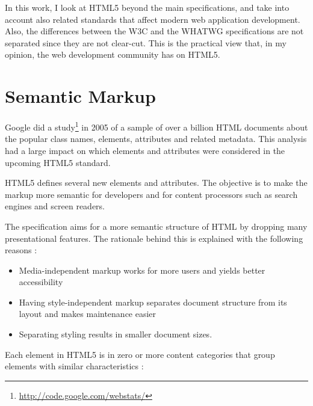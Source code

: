 In this work, I look at HTML5 beyond the main specifications, and take
into account also related standards that affect modern web application
development. Also, the differences between the W3C and the WHATWG
specifications are not separated since they are not clear-cut. This is
the practical view that, in my opinion, the web development community
has on HTML5.

\section{Semantic Markup}

Google did a study\footnote{\url{http://code.google.com/webstats/}} in
2005 of a sample of over a billion HTML documents about the popular
class names, elements, attributes and related metadata. This analysis
had a large impact on which elements and attributes were considered in
the upcoming HTML5 standard.

HTML5 defines several new elements and attributes. The objective is to
make the markup more semantic for developers and for content
processors such as search engines and screen readers.

The specification aims for a more semantic structure of HTML by
dropping many presentational features. The rationale behind this is
explained with the following reasons \cite{HTML5draft}:

\begin{itemize}
\item Media-independent markup works for more users and yields better
  accessibility
\item Having style-independent markup separates document structure
  from its layout and makes maintenance easier
\item Separating styling results in smaller document sizes.
\end{itemize}

\noindent Each element in HTML5 is in zero or more content categories
that group elements with similar characteristics \cite{HTML5draft}:

